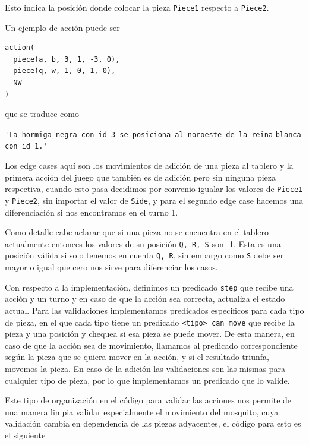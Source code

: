\documentclass[a4paper,11pt]{article}
\begin{document}
Esto indica la posici\'on donde colocar la pieza \verb+Piece1+ respecto a \verb+Piece2+.

Un ejemplo de acci\'on puede ser

\begin{lstlisting}
action(
  piece(a, b, 3, 1, -3, 0),
  piece(q, w, 1, 0, 1, 0),
  NW
)
\end{lstlisting}

que se traduce como

\begin{flushleft}
\verb+'La hormiga negra con id 3 se posiciona al noroeste de la reina+
\verb+blanca con id 1.'+
\end{flushleft}

Los edge cases aqu\'i son  los movimientos de adici\'on de una pieza al tablero y la primera acci\'on del juego que tambi\'en es de adici\'on pero sin ninguna pieza respectiva, cuando esto pasa decidimos por convenio igualar los valores de \verb+Piece1+ y \verb+Piece2+, sin importar el valor de \verb+Side+, y para el segundo edge case hacemos una diferenciaci\'on si nos encontramos en el turno 1.

Como detalle cabe aclarar que si una pieza no se encuentra en el tablero actualmente entonces los valores de su posici\'on \verb+Q, R, S+ son -1. Esta es una posici\'on v\'alida si solo tenemos en cuenta \verb+Q, R+, sin embargo como \verb+S+ debe ser mayor o igual que cero nos sirve para diferenciar los casos.

Con respecto a la implementaci\'on, definimos un predicado \verb+step+ que recibe una acci\'on y un turno y en caso de que la acci\'on sea correcta, actualiza el estado actual. Para las validaciones implementamos predicados especificos para cada tipo de pieza, en el que cada tipo tiene un predicado \verb+<tipo>_can_move+ que recibe la pieza y una posici\'on y chequea si esa pieza se puede mover. De esta manera, en caso de que la acci\'on sea de movimiento, llamamos al predicado correspondiente seg\'un la pieza que se quiera mover en la acci\'on, y si el resultado triunfa, movemos la pieza. En caso de la adici\'on las validaciones son las mismas para cualquier tipo de pieza, por lo que implementamos un predicado que lo valide.

Este tipo de organizaci\'on en el c\'odigo para validar las acciones nos permite de una manera limpia validar especialmente el movimiento del mosquito,
cuya validaci\'on cambia en dependencia de las piezas adyacentes, el c\'odigo
para esto es el siguiente
\end{document}
